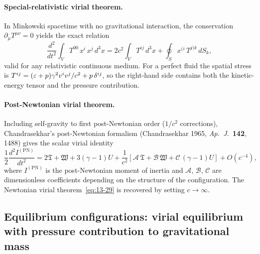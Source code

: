 \paragraph{Special-relativistic virial theorem.}
In Minkowski spacetime with no gravitational interaction, the
conservation $\partial_{\mu}T^{\mu\nu}=0$ yields the exact relation
\begin{equation}
\label{eq:rel-13-SR-virial}
\frac{d^{2}}{dt^{2}}\!\int_{V}\!T^{00}\,x^{i}\,x^{j}\,d^{3}x
  = 2c^{2}\!\int_{V}\!T^{ij}\,d^{3}x
  + \oint_{S}\!x^{(i}\,T^{j)k}\,dS_{k},
\end{equation}
valid for any relativistic continuous medium.  For a perfect fluid
the spatial stress is $T^{ij} = (\varepsilon+p)\gamma^{2}v^{i}v^{j}/c^{2}
+ p\,\delta^{ij}$, so the right-hand side contains both the
kinetic-energy tensor and the pressure contribution.

\paragraph{Post-Newtonian virial theorem.}
Including self-gravity to first post-Newtonian order
($1/c^{2}$ corrections), Chandrasekhar's post-Newtonian formalism
(Chandrasekhar 1965, \emph{Ap.\ J.}\ \textbf{142}, 1488) gives the
scalar virial identity
\begin{equation}
\label{eq:rel-13-PN-scalar}
\frac{1}{2}\frac{d^{2}I^{(\mathrm{PN})}}{dt^{2}}
  = 2\mathfrak{T} + \mathfrak{W} + 3(\gamma-1)U
  + \frac{1}{c^{2}}\left[
      \mathscr{A}\,\mathfrak{T}
    + \mathscr{B}\,\mathfrak{W}
    + \mathscr{C}\,(\gamma-1)U
    \right]
  + O(c^{-4}),
\end{equation}
where $I^{(\mathrm{PN})}$ is the post-Newtonian moment of inertia and
$\mathscr{A}$, $\mathscr{B}$, $\mathscr{C}$ are dimensionless
coefficients depending on the structure of the configuration.  The
Newtonian virial theorem~\eqref{eq:13-29} is recovered by setting
$c\to\infty$.


\subsection{Equilibrium configurations: virial equilibrium with
  pressure contribution to gravitational mass}
\label{sec:rel-117-equil}

